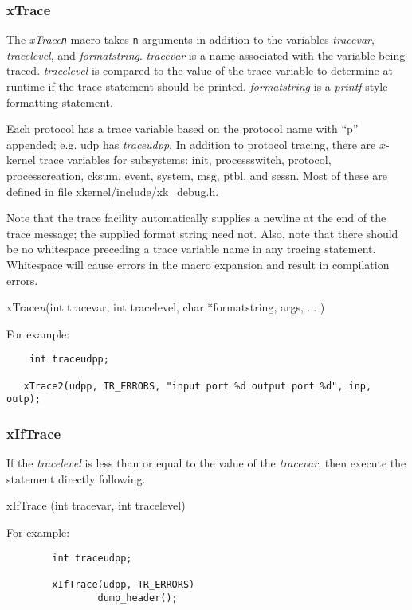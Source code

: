 \subsubsection{xTrace}

The {\em xTrace{\tt n}} macro takes {\tt n} arguments in addition to
the variables {\em tracevar}, {\em tracelevel}, and {\em
formatstring}.  {\em tracevar} is a name associated with the variable
being traced.  {\em tracelevel} is compared to the value of the trace
variable to determine at runtime if the trace statement should be
printed. {\em formatstring} is a {\em printf}-style formatting statement.

Each protocol has a trace variable based on the protocol name with
``p'' appended; e.g. udp has {\em traceudpp}.  In addition to protocol
tracing, there are $x$-kernel trace variables for subsystems: init,
processswitch, protocol, processcreation, cksum, event, system, msg,
ptbl, and sessn.  Most of these are defined in file {\sanss
xkernel/include/xk\_debug.h}.

Note that the trace facility automatically supplies a newline at the
end of the trace message; the supplied format string need not.  Also,
note that there should be no whitespace preceding a trace variable
name in any tracing statement.  Whitespace will cause errors in the
macro expansion and result in compilation errors.
\medskip

{\bold xTrace}{\em n}({\sem int} {\caps tracevar}, {\sem int} {\caps
tracelevel}, {\sem char} *{\caps formatstring}, {\caps args, ...} )
\medskip

\noindent For example:

\begin{verbatim}
	int traceudpp;

   xTrace2(udpp, TR_ERRORS, "input port %d output port %d", inp, outp);
\end{verbatim}

\subsubsection{xIfTrace}

If the {\em tracelevel} is less than or equal to the value of the {\em
tracevar}, then execute the statement directly following.
\medskip

{\bold xIfTrace} ({\sem int} {\caps tracevar}, {\sem int} {\caps tracelevel})

\medskip
\noindent For example:

\begin{verbatim}
        int traceudpp;

        xIfTrace(udpp, TR_ERRORS) 
                dump_header();
\end{verbatim}


